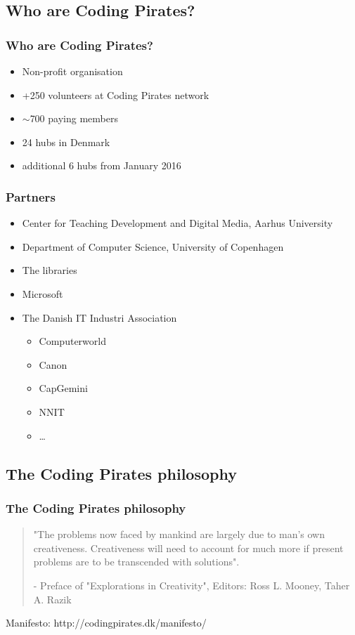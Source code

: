 \documentclass{beamer}
\begin{document}
\subsection{Who are Coding Pirates?}
\begin{frame}
\frametitle{Who are Coding Pirates?}
\begin{itemize}
\item Non-profit organisation
\item +250 volunteers at Coding Pirates network
\item $\sim$700 paying members
\item 24 hubs in Denmark
\item additional 6 hubs from January 2016
\end{itemize}


\end{frame}

\begin{frame}
  \frametitle{Partners}

\begin{itemize}
\item Center for Teaching Development and Digital Media, Aarhus
  University
\item Department of Computer Science, University of Copenhagen
\item The libraries
\item Microsoft
\item The Danish IT Industri Association
  \begin{itemize}
  \item Computerworld
  \item Canon
  \item CapGemini
  \item NNIT
  \item \ldots
  \end{itemize}
\end{itemize}
\end{frame}

\subsection{The Coding Pirates philosophy}
\begin{frame}
\frametitle{The Coding Pirates philosophy}

\begin{quotation}
  "The problems now faced by mankind are largely due to man's own
  creativeness. Creativeness will need to account for much more if
  present problems are to be transcended with solutions".

  - Preface of "Explorations in Creativity", Editors: Ross L. Mooney,
  Taher A. Razik
\end{quotation}


Manifesto: http://codingpirates.dk/manifesto/
\end{frame}
\end{document}
